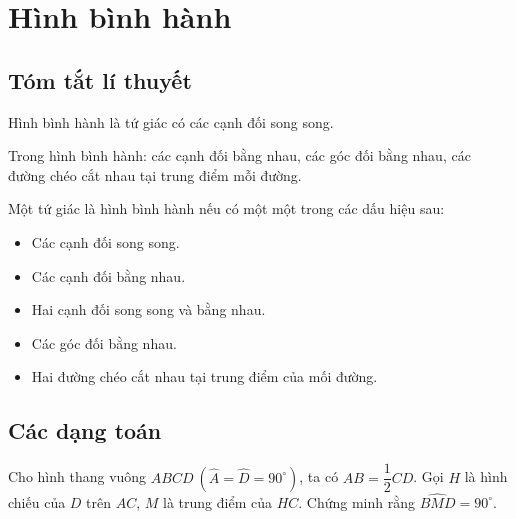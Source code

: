 \section{Hình bình hành}
\subsection{Tóm tắt lí thuyết}
\begin{dn}
Hình bình hành là tứ giác có các cạnh đối song song.
\end{dn}
\begin{dl}
Trong hình bình hành: các cạnh đối bằng nhau, các góc đối bằng nhau, các đường chéo cắt nhau tại trung điểm mỗi đường.
\end{dl}
\begin{dl}
Một tứ giác là hình bình hành nếu có một một trong các dấu hiệu sau:
\begin{itemize}
\item Các cạnh đối song song.
\item Các cạnh đối bằng nhau.
\item Hai cạnh đối song song và bằng nhau.
\item Các góc đối bằng nhau.
\item Hai đường chéo cắt nhau tại trung điểm của mối đường.
\end{itemize}
\end{dl}
\subsection{Các dạng toán}
\begin{vd}%
Cho hình thang vuông $ABCD\ (\widehat{A}=\widehat{D}=90^\circ)$, ta có $AB=\dfrac{1}{2}CD$. Gọi $H$ là hình chiếu của $D$ trên $AC$, $M$ là trung điểm của $HC$. Chứng minh rằng $\widehat{BMD}=90^\circ$.
\end{vd}

